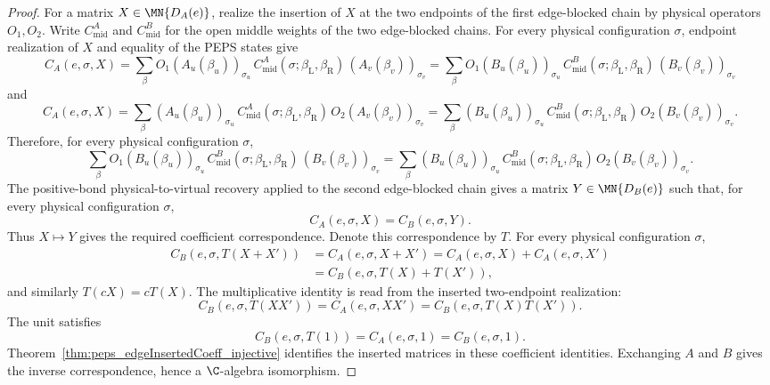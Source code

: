 \begin{proof}\leanok
    For a matrix $X\in\MN{D_A(e)}$, realize the insertion of $X$ at the two
    endpoints of the first edge-blocked chain by physical operators $O_1,O_2$.
    Write $C_{\mathrm{mid}}^A$ and $C_{\mathrm{mid}}^B$ for the open middle
    weights of the two edge-blocked chains. For every physical configuration
    $\sigma$, endpoint realization of $X$ and equality of the PEPS states give
    \[
        C_A(e,\sigma,X)
        =
        \sum_{\beta}
        O_1(A_u(\beta_u))_{\sigma_u}\,
        C_{\mathrm{mid}}^A(\sigma;\beta_{\mathrm{L}},\beta_{\mathrm{R}})\,
        (A_v(\beta_v))_{\sigma_v}
        =
        \sum_{\beta}
        O_1(B_u(\beta_u))_{\sigma_u}\,
        C_{\mathrm{mid}}^B(\sigma;\beta_{\mathrm{L}},\beta_{\mathrm{R}})\,
        (B_v(\beta_v))_{\sigma_v}
    \]
    and
    \[
        C_A(e,\sigma,X)
        =
        \sum_{\beta}
        (A_u(\beta_u))_{\sigma_u}\,
        C_{\mathrm{mid}}^A(\sigma;\beta_{\mathrm{L}},\beta_{\mathrm{R}})\,
        O_2(A_v(\beta_v))_{\sigma_v}
        =
        \sum_{\beta}
        (B_u(\beta_u))_{\sigma_u}\,
        C_{\mathrm{mid}}^B(\sigma;\beta_{\mathrm{L}},\beta_{\mathrm{R}})\,
        O_2(B_v(\beta_v))_{\sigma_v}.
    \]
    Therefore, for every physical configuration $\sigma$,
    \[
        \sum_{\beta}
        O_1(B_u(\beta_u))_{\sigma_u}\,
        C_{\mathrm{mid}}^B(\sigma;\beta_{\mathrm{L}},\beta_{\mathrm{R}})\,
        (B_v(\beta_v))_{\sigma_v}
        =
        \sum_{\beta}
        (B_u(\beta_u))_{\sigma_u}\,
        C_{\mathrm{mid}}^B(\sigma;\beta_{\mathrm{L}},\beta_{\mathrm{R}})\,
        O_2(B_v(\beta_v))_{\sigma_v}.
    \]
    The positive-bond physical-to-virtual recovery applied to the second
    edge-blocked chain gives a matrix $Y\in\MN{D_B(e)}$ such that, for every
    physical configuration $\sigma$,
    \[
        C_A(e,\sigma,X)=C_B(e,\sigma,Y).
    \]
    Thus $X\mapsto Y$ gives the required coefficient correspondence.  Denote
    this correspondence by $T$.  For every physical configuration $\sigma$,
    \[
        \begin{aligned}
            C_B(e,\sigma,T(X+X'))
             & =
            C_A(e,\sigma,X+X')
            =
            C_A(e,\sigma,X)+C_A(e,\sigma,X') \\
             & =
            C_B(e,\sigma,T(X)+T(X')),
        \end{aligned}
    \]
    and similarly \(T(cX)=cT(X)\).  The multiplicative identity is read from
    the inserted two-endpoint realization:
    \[
        C_B(e,\sigma,T(XX'))
        =
        C_A(e,\sigma,XX')
        =
        C_B(e,\sigma,T(X)T(X')).
    \]
    The unit satisfies
    \[
        C_B(e,\sigma,T(1))=C_A(e,\sigma,1)=C_B(e,\sigma,1).
    \]
    Theorem~\ref{thm:peps_edgeInsertedCoeff_injective} identifies the inserted
    matrices in these coefficient identities.  Exchanging $A$ and $B$ gives the
    inverse correspondence, hence a $\C$-algebra isomorphism.
\end{proof}

